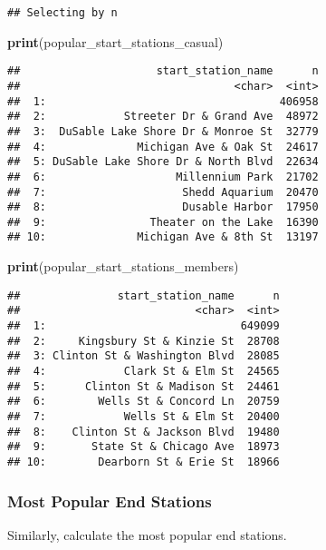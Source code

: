 \documentclass[
]{article}
\newenvironment{Shaded}{\begin{snugshade}}{\end{snugshade}}
\newcommand{\FunctionTok}[1]{\textcolor[rgb]{0.13,0.29,0.53}{\textbf{#1}}}
\newcommand{\NormalTok}[1]{#1}
\begin{document}
\begin{verbatim}
## Selecting by n
\end{verbatim}

\begin{Shaded}
\begin{Highlighting}[]
\FunctionTok{print}\NormalTok{(popular\_start\_stations\_casual)}
\end{Highlighting}
\end{Shaded}

\begin{verbatim}
##                     start_station_name      n
##                                 <char>  <int>
##  1:                                    406958
##  2:            Streeter Dr & Grand Ave  48972
##  3:  DuSable Lake Shore Dr & Monroe St  32779
##  4:              Michigan Ave & Oak St  24617
##  5: DuSable Lake Shore Dr & North Blvd  22634
##  6:                    Millennium Park  21702
##  7:                     Shedd Aquarium  20470
##  8:                     Dusable Harbor  17950
##  9:                Theater on the Lake  16390
## 10:              Michigan Ave & 8th St  13197
\end{verbatim}

\begin{Shaded}
\begin{Highlighting}[]
\FunctionTok{print}\NormalTok{(popular\_start\_stations\_members)}
\end{Highlighting}
\end{Shaded}

\begin{verbatim}
##               start_station_name      n
##                           <char>  <int>
##  1:                              649099
##  2:     Kingsbury St & Kinzie St  28708
##  3: Clinton St & Washington Blvd  28085
##  4:            Clark St & Elm St  24565
##  5:      Clinton St & Madison St  24461
##  6:        Wells St & Concord Ln  20759
##  7:            Wells St & Elm St  20400
##  8:    Clinton St & Jackson Blvd  19480
##  9:       State St & Chicago Ave  18973
## 10:        Dearborn St & Erie St  18966
\end{verbatim}

\subsubsection{Most Popular End
Stations}\label{most-popular-end-stations}

Similarly, calculate the most popular end stations.
\end{document}
